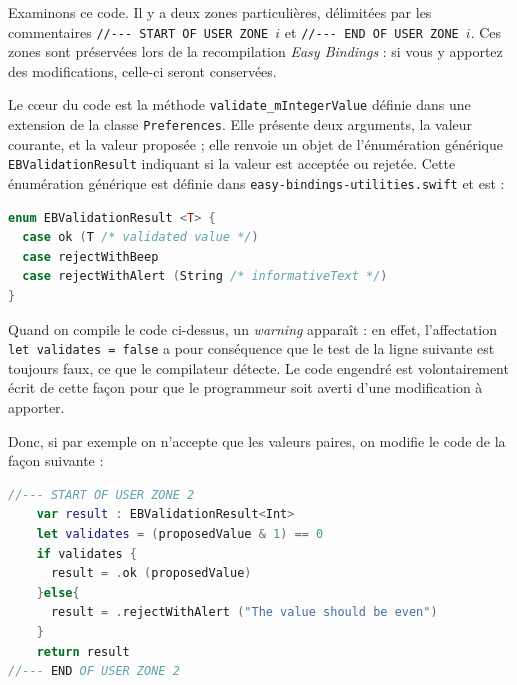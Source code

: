 Examinons ce code. Il y a deux zones particulières, délimitées par les commentaires \texttt{//-{}-{}- START OF USER ZONE $i$} et \texttt{//-{}-{}- END OF USER ZONE $i$}. Ces zones sont préservées lors de la recompilation \emph{Easy Bindings} : si vous y apportez des modifications, celle-ci seront conservées.

Le cœur du code est la méthode \texttt{validate\_mIntegerValue} définie dans une extension de la classe \texttt{Preferences}. Elle présente deux arguments, la valeur courante, et la valeur proposée ; elle renvoie un objet de l'énumération générique \texttt{EBValidationResult} indiquant si la valeur est acceptée ou rejetée. Cette énumération générique est définie dans \texttt{easy-bindings-utilities.swift} et est :

\begin{lstlisting}[language=swift]
enum EBValidationResult <T> {
  case ok (T /* validated value */)
  case rejectWithBeep
  case rejectWithAlert (String /* informativeText */)
}
\end{lstlisting}

Quand on compile le code ci-dessus, un \emph{warning} apparaît : en effet, l'affectation \texttt{let validates = false} a pour conséquence que le test de la ligne suivante est toujours faux, ce que le compilateur détecte. Le code engendré est volontairement écrit de cette façon pour que le programmeur soit averti d'une modification à apporter.

 
Donc, si par exemple on n'accepte que les valeurs paires, on modifie le code de la façon suivante :
\begin{lstlisting}[language=swift]
//--- START OF USER ZONE 2
    var result : EBValidationResult<Int>
    let validates = (proposedValue & 1) == 0
    if validates {
      result = .ok (proposedValue)
    }else{
      result = .rejectWithAlert ("The value should be even")
    }
    return result
//--- END OF USER ZONE 2
\end{lstlisting}


